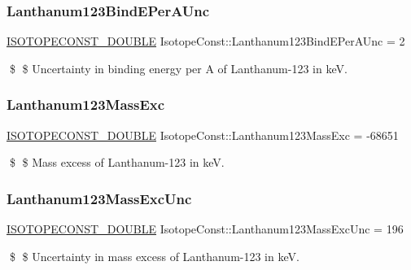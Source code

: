 \subsubsection{\texorpdfstring{Lanthanum123\+Bind\+E\+Per\+A\+Unc}{Lanthanum123BindEPerAUnc}}
{\footnotesize\ttfamily \mbox{\hyperlink{group___isotope_const-_macros_ga8f45a7272ce02c0b4c65c44636ed719a}{I\+S\+O\+T\+O\+P\+E\+C\+O\+N\+S\+T\+\_\+\+D\+O\+U\+B\+LE}} Isotope\+Const\+::\+Lanthanum123\+Bind\+E\+Per\+A\+Unc = 2}

\$ \$ Uncertainty in binding energy per A of Lanthanum-\/123 in keV. \mbox{\label{group___isotope_const-_lanthanum-_la123_ga4eef5f4651cf2ff754958fcb6c2a86ab}} 
\subsubsection{\texorpdfstring{Lanthanum123\+Mass\+Exc}{Lanthanum123MassExc}}
{\footnotesize\ttfamily \mbox{\hyperlink{group___isotope_const-_macros_ga8f45a7272ce02c0b4c65c44636ed719a}{I\+S\+O\+T\+O\+P\+E\+C\+O\+N\+S\+T\+\_\+\+D\+O\+U\+B\+LE}} Isotope\+Const\+::\+Lanthanum123\+Mass\+Exc = -\/68651}

\$ \$ Mass excess of Lanthanum-\/123 in keV. \mbox{\label{group___isotope_const-_lanthanum-_la123_ga6e8d9d4030473f8e2b41b26ff5dfd35e}} 
\subsubsection{\texorpdfstring{Lanthanum123\+Mass\+Exc\+Unc}{Lanthanum123MassExcUnc}}
{\footnotesize\ttfamily \mbox{\hyperlink{group___isotope_const-_macros_ga8f45a7272ce02c0b4c65c44636ed719a}{I\+S\+O\+T\+O\+P\+E\+C\+O\+N\+S\+T\+\_\+\+D\+O\+U\+B\+LE}} Isotope\+Const\+::\+Lanthanum123\+Mass\+Exc\+Unc = 196}

\$ \$ Uncertainty in mass excess of Lanthanum-\/123 in keV. \mbox{\label{group___isotope_const-_lanthanum-_la123_ga98fe38e3270accfac4d26f96b67f91fa}} 
